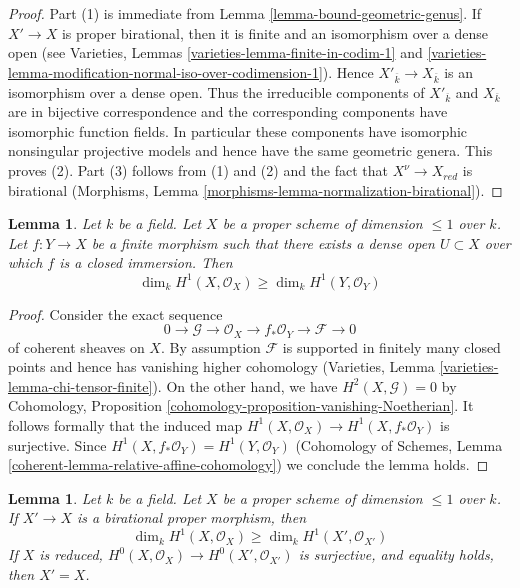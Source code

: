 \documentclass{stacks-project}
\theoremstyle{plain}
\newtheorem{lemma}[subsection]{Lemma}
\theoremstyle{definition}
\theoremstyle{remark}
\numberwithin{equation}{subsection}
\begin{document}
\begin{proof}
Part (1) is immediate from Lemma \ref{lemma-bound-geometric-genus}.
If $X' \to X$ is proper birational, then it is finite and
an isomorphism over a dense open (see
Varieties, Lemmas \ref{varieties-lemma-finite-in-codim-1} and
\ref{varieties-lemma-modification-normal-iso-over-codimension-1}).
Hence $X'_{\overline{k}} \to X_{\overline{k}}$ is an isomorphism
over a dense open. Thus the irreducible components of $X'_{\overline{k}}$
and $X_{\overline{k}}$ are in bijective correspondence and the
corresponding components have isomorphic function fields.
In particular these components have isomorphic nonsingular projective models
and hence have the same geometric genera.
This proves (2).
Part (3) follows from (1) and (2) and the fact that
$X^\nu \to X_{red}$ is birational
(Morphisms, Lemma \ref{morphisms-lemma-normalization-birational}).
\end{proof}

\begin{lemma}
\label{lemma-genus-goes-down}
Let $k$ be a field. Let $X$ be a proper scheme of dimension
$\leq 1$ over $k$. Let $f : Y \to X$ be a finite morphism
such that there exists a dense open $U \subset X$ over
which $f$ is a closed immersion. Then
$$
\dim_k H^1(X, \mathcal{O}_X) \geq \dim_k H^1(Y, \mathcal{O}_Y)
$$
\end{lemma}

\begin{proof}
Consider the exact sequence
$$
0 \to \mathcal{G} \to \mathcal{O}_X \to f_*\mathcal{O}_Y \to \mathcal{F} \to 0
$$
of coherent sheaves on $X$.
By assumption $\mathcal{F}$ is supported in finitely many closed points
and hence has vanishing higher cohomology
(Varieties, Lemma \ref{varieties-lemma-chi-tensor-finite}).
On the other hand, we have $H^2(X, \mathcal{G}) = 0$ by
Cohomology, Proposition \ref{cohomology-proposition-vanishing-Noetherian}.
It follows formally that the induced map
$H^1(X, \mathcal{O}_X) \to H^1(X, f_*\mathcal{O}_Y)$
is surjective. Since $H^1(X, f_*\mathcal{O}_Y) = H^1(Y, \mathcal{O}_Y)$
(Cohomology of Schemes, Lemma \ref{coherent-lemma-relative-affine-cohomology})
we conclude the lemma holds.
\end{proof}

\begin{lemma}
\label{lemma-genus-normalization}
Let $k$ be a field. Let $X$ be a proper scheme of dimension $\leq 1$ over $k$.
If $X' \to X$ is a birational proper morphism, then
$$
\dim_k H^1(X, \mathcal{O}_X) \geq \dim_k H^1(X', \mathcal{O}_{X'})
$$
If $X$ is reduced, $H^0(X, \mathcal{O}_X) \to H^0(X', \mathcal{O}_{X'})$
is surjective, and equality holds, then $X' = X$.
\end{lemma}
\end{document}
